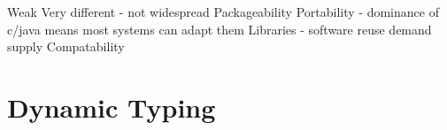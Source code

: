 \documentclass[11pt,a4paper,article,oneside]{memoir}
\begin{document}
Weak
Very different - not widespread
Packageability
Portability - dominance of c/java means most systems can adapt them
Libraries - software reuse demand supply
Compatability
\section{Dynamic Typing}

\newpage


%
%
\end{document}

